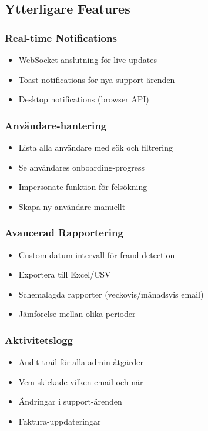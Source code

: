 \documentclass[12pt,a4paper]{article}
\begin{document}
\subsection{Ytterligare Features}

\subsubsection{Real-time Notifications}
\begin{itemize}
  \item WebSocket-anslutning för live updates
  \item Toast notifications för nya support-ärenden
  \item Desktop notifications (browser API)
\end{itemize}

\subsubsection{Användare-hantering}
\begin{itemize}
  \item Lista alla användare med sök och filtrering
  \item Se användares onboarding-progress
  \item Impersonate-funktion för felsökning
  \item Skapa ny användare manuellt
\end{itemize}

\subsubsection{Avancerad Rapportering}
\begin{itemize}
  \item Custom datum-intervall för fraud detection
  \item Exportera till Excel/CSV
  \item Schemalagda rapporter (veckovis/månadsvis email)
  \item Jämförelse mellan olika perioder
\end{itemize}

\subsubsection{Aktivitetslogg}
\begin{itemize}
  \item Audit trail för alla admin-åtgärder
  \item Vem skickade vilken email och när
  \item Ändringar i support-ärenden
  \item Faktura-uppdateringar
\end{itemize}
\end{document}
